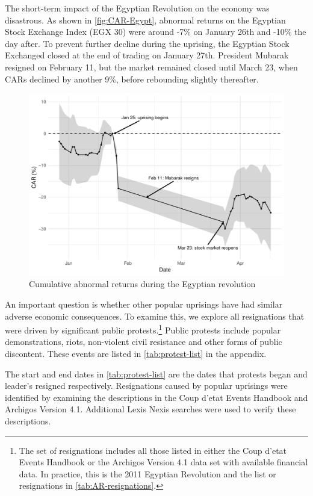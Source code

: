 \documentclass[12pt,final,fleqn]{article}
\theoremstyle{plain}
\begin{document}
The short-term impact of the Egyptian Revolution on the economy was disastrous. As shown in \autoref{fig:CAR-Egypt}, abnormal returns on the Egyptian Stock Exchange Index (EGX 30) were around -7\% on January 26th and -10\% the day after. To prevent further decline during the uprising, the Egyptian Stock Exchanged closed at the end of trading on January 27th. President Mubarak resigned on February 11, but the market remained closed until March 23, when CARs declined by another 9\%, before rebounding slightly thereafter.

\begin{figure}[!ht]
\includegraphics{../figs/egypt-revolution-2011.pdf}
\caption{Cumulative abnormal returns during the Egyptian revolution}
\label{fig:CAR-Egypt}
\end{figure}

An important question is whether other popular uprisings have had similar adverse economic consequences. To examine this, we explore all resignations that were driven by significant public protests.\footnote{The set of resignations includes all those listed in either the Coup d'etat Events Handbook or the Archigos Version 4.1 data set with available financial data. In practice, this is the 2011 Egyptian Revolution and the list or resignations in \autoref{tab:AR-resignations}.} Public protests include popular demonstrations, riots, non-violent civil resistance and other forms of public discontent. These events are listed in \autoref{tab:protest-list} in the appendix.

The start and end dates in \autoref{tab:protest-list} are the dates that protests began and leader's resigned respectively. Resignations caused by popular uprisings were identified by examining the descriptions in the Coup d'etat Events Handbook and Archigos Version 4.1. Additional Lexis Nexis searches were used to verify these descriptions.
\end{document}
